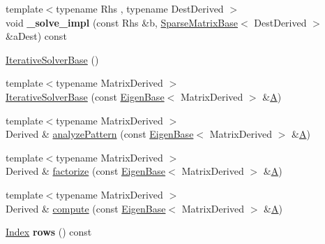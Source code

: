 \begin{DoxyCompactItemize}
{\footnotesize template$<$typename Rhs , typename Dest\+Derived $>$ }\\void {\bfseries \+\_\+solve\+\_\+impl} (const Rhs \&b, \hyperlink{group___sparse_core___module_class_eigen_1_1_sparse_matrix_base}{Sparse\+Matrix\+Base}$<$ Dest\+Derived $>$ \&a\+Dest) const
\item 
\hyperlink{group___iterative_linear_solvers___module_a0922f2be45082690d7734aa6732fc493}{Iterative\+Solver\+Base} ()
\item 
{\footnotesize template$<$typename Matrix\+Derived $>$ }\\\hyperlink{group___iterative_linear_solvers___module_a3c68fe3cd929ea1ff8a0d4cbcd65ebad}{Iterative\+Solver\+Base} (const \hyperlink{group___core___module_struct_eigen_1_1_eigen_base}{Eigen\+Base}$<$ Matrix\+Derived $>$ \&\hyperlink{group___core___module_class_eigen_1_1_matrix}{A})
\item 
{\footnotesize template$<$typename Matrix\+Derived $>$ }\\Derived \& \hyperlink{group___iterative_linear_solvers___module_a3f684fb41019ca04d97ddc08a0d8be2e}{analyze\+Pattern} (const \hyperlink{group___core___module_struct_eigen_1_1_eigen_base}{Eigen\+Base}$<$ Matrix\+Derived $>$ \&\hyperlink{group___core___module_class_eigen_1_1_matrix}{A})
\item 
{\footnotesize template$<$typename Matrix\+Derived $>$ }\\Derived \& \hyperlink{group___iterative_linear_solvers___module_a1374b141721629983cd8276b4b87fc58}{factorize} (const \hyperlink{group___core___module_struct_eigen_1_1_eigen_base}{Eigen\+Base}$<$ Matrix\+Derived $>$ \&\hyperlink{group___core___module_class_eigen_1_1_matrix}{A})
\item 
{\footnotesize template$<$typename Matrix\+Derived $>$ }\\Derived \& \hyperlink{group___iterative_linear_solvers___module_a7dfa55c55e82d697bde227696a630914}{compute} (const \hyperlink{group___core___module_struct_eigen_1_1_eigen_base}{Eigen\+Base}$<$ Matrix\+Derived $>$ \&\hyperlink{group___core___module_class_eigen_1_1_matrix}{A})
\item 
\mbox{\label{group___iterative_linear_solvers___module_a51213f927ba8c833807544bf5e58c8b9}} 
\hyperlink{namespace_eigen_a62e77e0933482dafde8fe197d9a2cfde}{Index} {\bfseries rows} () const
\item 
\mbox{\label{group___iterative_linear_solvers___module_a0f6ceadc947fcbe32a3c68060e2ce6be}} 

\end{DoxyCompactItemize}
